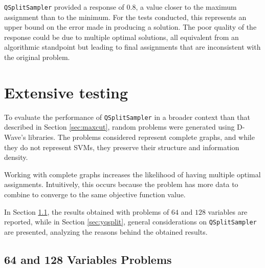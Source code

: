 \texttt{QSplitSampler} provided a response of $0.8$, a value closer to the maximum assignment than to the minimum. 
For the tests conducted, this represents an upper bound on the error made in producing a solution. 
The poor quality of the response could be due to multiple optimal solutions, all equivalent from an algorithmic standpoint but leading to final assignments that are inconsistent with the original problem.

\section{Extensive testing}\label{sec:qsplittest}

To evaluate the performance of \texttt{QSplitSampler} in a broader context than that described in Section \ref{sec:maxcut}, random problems were generated using D-Wave's libraries. 
The problems considered represent complete graphs, and while they do not represent SVMs, they preserve their structure and information density.

Working with complete graphs increases the likelihood of having multiple optimal assignments. 
Intuitively, this occurs because the problem has more data to combine to converge to the same objective function value.

In Section \ref{sec:multivar}, the results obtained with problems of $64$ and $128$ variables are reported, while in Section \ref{sec:yqsplit}, general considerations on \texttt{QSplitSampler} are presented, analyzing the reasons behind the obtained results.

\subsection{64 and 128 Variables Problems}\label{sec:multivar}

